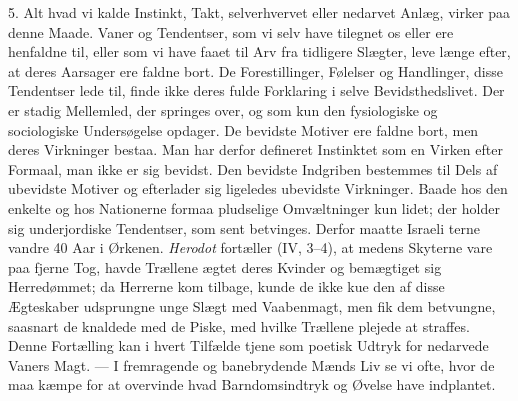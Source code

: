 \documentclass[12pt,a4paper,openany]{book}
\newcommand{\opage}[1]{\marginnote{\footnotesize\textit{[#1]}}}
\begin{document}
5. Alt hvad vi kalde Instinkt, Takt, selverhvervet eller nedarvet Anlæg,
virker paa denne Maade. Vaner og Tendentser, som vi selv have tilegnet
os eller ere henfaldne til, eller som vi have faaet til Arv fra
tidligere Slægter, leve længe efter, at deres Aarsager ere faldne bort.
De Forestillinger, Følelser og Handlinger, disse Tendentser lede til,
finde ikke deres fulde Forklaring i selve Bevidsthedslivet. Der er
stadig Mellemled, der springes over, og som kun den fysiologiske og
sociologiske Undersøgelse opdager. De bevidste Motiver ere faldne bort,
men deres Virkninger bestaa. Man har derfor defineret Instinktet som en
Virken efter Formaal, man ikke er sig bevidst. Den bevidste Indgriben
bestemmes til Dels af ubevidste Motiver og efterlader sig ligeledes
ubevidste Virkninger. Baade hos den enkelte og hos Nationerne formaa
pludselige Omvæltninger kun lidet; der holder sig underjordiske
Tendentser, som sent betvinges. Derfor maatte Israeli%
\opage{90}terne vandre 40 Aar i Ørkenen. \emph{Herodot} fortæller (IV,
3--4), at medens Skyterne vare paa fjerne Tog, havde Trællene ægtet deres
Kvinder og bemægtiget sig Herredømmet; da Herrerne kom tilbage, kunde de
ikke kue den af disse Ægteskaber udsprungne unge Slægt med Vaabenmagt,
men fik dem betvungne, saasnart de knaldede med de Piske, med hvilke
Trællene plejede at straffes. Denne Fortælling kan i hvert Tilfælde
tjene som poetisk Udtryk for nedarvede Vaners Magt. --- I fremragende og
banebrydende Mænds Liv se vi ofte, hvor de maa kæmpe for at overvinde
hvad Barndomsindtryk og Øvelse have indplantet.
\end{document}
